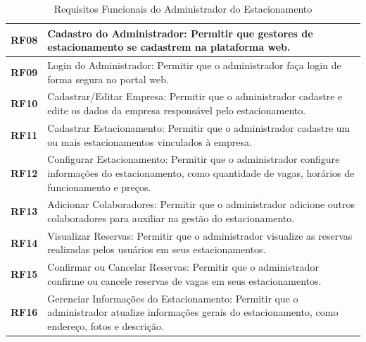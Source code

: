 \begin{table}[H]
\begin{center}
\caption{Requisitos Funcionais do Administrador do Estacionamento}
\label{tab:requisitos-funcionais-admin}
\begin{tabular}{|c|p{11cm}|}
\hline
\textbf{RF08} & Cadastro do Administrador: Permitir que gestores de estacionamento se cadastrem na plataforma web. \\
\hline
\textbf{RF09} & Login do Administrador: Permitir que o administrador faça login de forma segura no portal web. \\
\hline
\textbf{RF10} & Cadastrar/Editar Empresa: Permitir que o administrador cadastre e edite os dados da empresa responsável pelo estacionamento. \\
\hline
\textbf{RF11} & Cadastrar Estacionamento: Permitir que o administrador cadastre um ou mais estacionamentos vinculados à empresa. \\
\hline
\textbf{RF12} & Configurar Estacionamento: Permitir que o administrador configure informações do estacionamento, como quantidade de vagas, horários de funcionamento e preços. \\
\hline
\textbf{RF13} & Adicionar Colaboradores: Permitir que o administrador adicione outros colaboradores para auxiliar na gestão do estacionamento. \\
\hline
\textbf{RF14} & Visualizar Reservas: Permitir que o administrador visualize as reservas realizadas pelos usuários em seus estacionamentos. \\
\hline
\textbf{RF15} & Confirmar ou Cancelar Reservas: Permitir que o administrador confirme ou cancele reservas de vagas em seus estacionamentos. \\
\hline
\textbf{RF16} & Gerenciar Informações do Estacionamento: Permitir que o administrador atualize informações gerais do estacionamento, como endereço, fotos e descrição. \\
\hline
\end{tabular}
\end{center}
\end{table}

